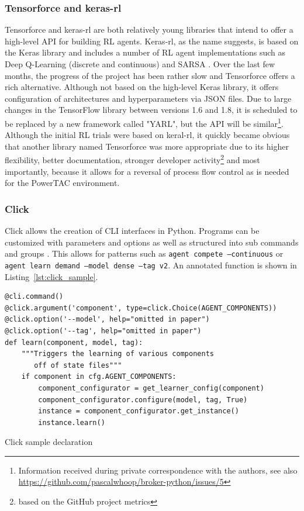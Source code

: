 \subsubsection{Tensorforce and keras-rl}%
\label{sub:tensorforce_and_keras_rl}

Tensorforce and keras-rl are both relatively young libraries that intend to offer a high-level \ac{API} for building
\ac{RL} agents. Keras-rl, as the name suggests, is based on the Keras library and includes a number of \ac{RL} agent
implementations such as Deep Q-Learning (discrete and continuous) and \ac{SARSA} \citep{plappert2016kerasrl}. Over the
last few months, the progress of the project has been rather slow and Tensorforce offers a rich alternative.
Although not based on the high-level Keras library, it offers configuration of architectures and hyperparameters via
\ac{JSON} files. Due to large changes in the TensorFlow library between versions 1.6 and 1.8, it is scheduled to be
replaced by a new framework called "YARL", but the \ac{API} will be similar\footnote{Information received during private
    correspondence with the authors, see also
\url{https://github.com/pascalwhoop/broker-python/issues/5}}. Although the initial \ac{RL} trials were based on
keral-rl, it quickly became obvious that another library named Tensorforce was more appropriate due to its higher
flexibility, better documentation, stronger developer activity\footnote{based on the GitHub project metrics} and most
importantly, because it allows for a reversal of process flow control as is needed for the
\ac{PowerTAC} environment.

\subsubsection{Click}%
\label{sub:click}

Click allows the creation of CLI interfaces in Python. Programs can be customized with parameters and options as well
as structured into sub commands and groups \citep{clickcli}. This allows for patterns such as \texttt{agent compete
--continuous} or \texttt{agent learn demand --model dense --tag v2}. An annotated function is shown in
Listing~\ref{lst:click_sample}.

\begin{listing}[h]
    \begin{verbatim}
@cli.command()
@click.argument('component', type=click.Choice(AGENT_COMPONENTS))
@click.option('--model', help="omitted in paper")
@click.option('--tag', help="omitted in paper")
def learn(component, model, tag):
    """Triggers the learning of various components
       off of state files"""
    if component in cfg.AGENT_COMPONENTS:
        component_configurator = get_learner_config(component)
        component_configurator.configure(model, tag, True)
        instance = component_configurator.get_instance()
        instance.learn()
    \end{verbatim}
    \caption{Click sample declaration}
    \label{lst:click_sample}
\end{listing}

